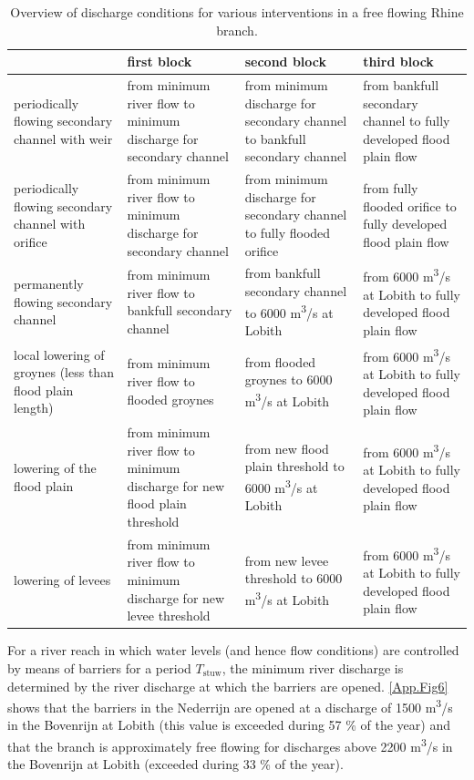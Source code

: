 \begin{table}
\small
\begin{tabular}{p{}|p{}|p{}|p{}}
 & first block & second block & third block \\ \hline
periodically flowing secondary channel with weir & from minimum river flow to minimum discharge for secondary channel & from minimum discharge for secondary channel to bankfull secondary channel & from bankfull secondary channel to fully developed flood plain flow \\ \hline
periodically flowing secondary channel with orifice & from minimum river flow to minimum discharge for secondary channel & from minimum discharge for secondary channel to fully flooded orifice & from fully flooded orifice to fully developed flood plain flow \\ \hline
permanently flowing secondary channel & from minimum river flow to bankfull secondary channel & from bankfull secondary channel to 6000 m\textsuperscript{3}/s at Lobith & from 6000 m\textsuperscript{3}/s at Lobith to fully developed flood plain flow \\ \hline
local lowering of groynes (less than flood plain length) & from minimum river flow to flooded groynes & from flooded groynes to 6000 m\textsuperscript{3}/s at Lobith & from 6000 m\textsuperscript{3}/s at Lobith to fully developed flood plain flow \\ \hline
lowering of the flood plain & from minimum river flow to minimum discharge for new flood plain threshold & from new flood plain threshold to 6000 m\textsuperscript{3}/s at Lobith & from 6000 m\textsuperscript{3}/s at Lobith to fully developed flood plain flow \\ \hline
lowering of levees & from minimum river flow to minimum discharge for new levee threshold & from new levee threshold to 6000 m\textsuperscript{3}/s at Lobith & from 6000 m\textsuperscript{3}/s at Lobith to fully developed flood plain flow \\
\end{tabular}

\caption{Overview of discharge conditions for various interventions in a free flowing Rhine branch.}
\label{App.Tab1}
\end{table}

For a river reach in which water levels (and hence flow conditions) are controlled by means of barriers for a period $T_\text{stuw}$, the minimum river discharge is determined by the river discharge at which the barriers are opened.
\autoref{App.Fig6} shows that the barriers in the Nederrijn are opened at a discharge of 1500 m\textsuperscript{3}/s in the Bovenrijn at Lobith (this value is exceeded during 57 \% of the year) and that the branch is approximately free flowing for discharges above 2200 m\textsuperscript{3}/s in the Bovenrijn at Lobith (exceeded during 33 \% of the year).


